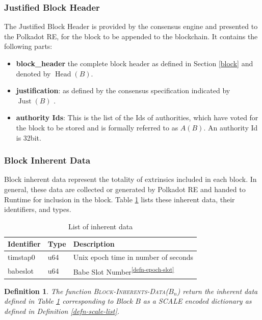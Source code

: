 \documentclass{book}
\newcommand{\tmname}[1]{\textsc{#1}}
\newcommand{\tmop}[1]{\ensuremath{\operatorname{#1}}}
\newcommand{\tmrsup}[1]{\textsuperscript{#1}}
\newcommand{\tmsamp}[1]{\textsf{#1}}
\newcommand{\tmstrong}[1]{\textbf{#1}}
\newtheorem{definition}{Definition}
\newtheorem{definition}{Definition}
\begin{document}
\subsubsection{Justified Block Header}

The Justified Block Header is provided by the consensus engine and presented
to the Polkadot RE, for the block to be appended to the blockchain. It
contains the following parts:
\begin{itemize}
  \item {\tmstrong{{\tmsamp{{\tmstrong{block\_header}}}}}} the complete block
  header as defined in Section \ref{block} and denoted by $\tmop{Head} (B)$.
  
  \item {\tmstrong{{\tmsamp{justification}}}}: as defined by the consensus
  specification indicated by $\tmop{Just} (B)$ {}.
  
  \item {\tmstrong{{\tmsamp{authority Ids}}}}: This is the list of the Ids of
  authorities, which have voted for the block to be stored and is formally
  referred to as $A (B)$. An authority Id is 32bit.
\end{itemize}

\subsubsection{Block Inherent Data}

Block inherent data represent the totality of extrinsics included in each
block. In general, these data are collected or generated by Polkadot RE and
handed to Runtime for inclusion in the block. Table \ref{tabl-inherent-data}
lists these inherent data, their identifiers, and types.

\begin{table}[h]
  \begin{tabular}{lll}
    \hline
    Identifier & Type  & Description\\
    \hline
    timstap0 & u64 & Unix epoch time in number of seconds\\
    babeslot & u64 & Babe Slot Number\tmrsup{\ref{defn-epoch-slot}}\\
    \hline
  \end{tabular}
  \caption{\label{tabl-inherent-data}List of inherent data}
\end{table}

\begin{definition}
  \label{defn-func-inherent-data}The function
  {\tmname{Block-Inherents-Data($B_n$)}} return the inherent data defined in
  Table \ref{tabl-inherent-data} corresponding to Block $B$ as a SCALE encoded
  dictionary as defined in Definition \ref{defn-scale-list}.
\end{definition}
\end{document}
